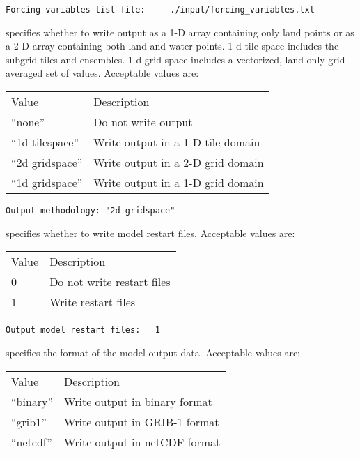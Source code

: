  \begin{Verbatim}[frame=single]
Forcing variables list file:     ./input/forcing_variables.txt
 \end{Verbatim}

 
  specifies whether to write output as a
 1-D array containing only land points or as a 2-D array containing
 both land and water points. 1-d tile space includes the subgrid 
 tiles and ensembles. 1-d grid space includes a vectorized, land-only
 grid-averaged set of values. 
 Acceptable values are:

 \begin{tabular}{ll}
 Value          & Description                         \\
 ``none''         & Do not write output               \\
 ``1d tilespace'' & Write output in a 1-D tile domain \\
 ``2d gridspace'' & Write output in a 2-D grid domain \\
 ``1d gridspace'' & Write output in a 1-D grid domain \\
 \end{tabular}
 

 \begin{Verbatim}[frame=single]
Output methodology: "2d gridspace"
 \end{Verbatim}

 
  specifies whether to write
 model restart files.
 Acceptable values are:

 \begin{tabular}{ll}
 Value & Description                \\
 0     & Do not write restart files \\
 1     & Write restart files        \\
 \end{tabular}
 

 \begin{Verbatim}[frame=single]
Output model restart files:   1
 \end{Verbatim}

 
  specifies the format of the model output data.
 Acceptable values are:

 \begin{tabular}{ll}
 Value      & Description                       \\
 ``binary'' & Write output in binary format     \\
 ``grib1''  & Write output in GRIB-1 format     \\
 ``netcdf'' & Write output in netCDF format     \\
 \end{tabular}
 

